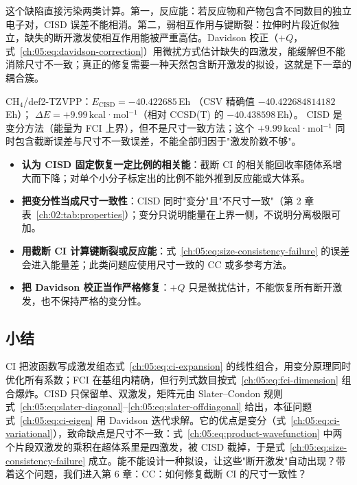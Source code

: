 这个缺陷直接污染两类计算。第一，反应能：若反应物和产物包含不同数目的独立电子对，CISD 误差不能相消。第二，弱相互作用与键断裂：拉伸时片段近似独立，缺失的断开激发使相互作用能被严重高估。Davidson 校正（$+Q$，式~\eqref{ch:05:eq:davidson-correction}）用微扰方式估计缺失的四激发，能缓解但不能消除尺寸不一致；真正的修复需要一种天然包含断开激发的拟设，这就是下一章的耦合簇。

\begin{ch4box}
CH$_4$/def2-TZVPP：$E_{\mathrm{CISD}} = -40.422685$\,Eh
（CSV 精确值 $-40.422684814182$\,Eh）；
$\Delta E = +9.99$\,kcal·mol$^{-1}$（相对 CCSD(T) 的 $-40.438598$\,Eh）。
CISD 是变分方法（能量为 FCI 上界），但不是尺寸一致方法；这个 $+9.99$\,kcal·mol$^{-1}$ 同时包含截断误差与尺寸不一致误差，不能全部归因于"激发阶数不够"。
\end{ch4box}

\begin{pitfall}
\begin{itemize}
  \item \textbf{认为 CISD 固定恢复一定比例的相关能}：截断 CI 的相关能回收率随体系增大而下降；对单个小分子标定出的比例不能外推到反应能或大体系。
  \item \textbf{把变分性当成尺寸一致性}：CISD 同时"变分"且"不尺寸一致"（第 2 章表~\ref{ch:02:tab:properties}）；变分只说明能量在上界一侧，不说明分离极限可加。
  \item \textbf{用截断 CI 计算键断裂或反应能}：式~\eqref{ch:05:eq:size-consistency-failure} 的误差会进入能量差；此类问题应使用尺寸一致的 CC 或多参考方法。
  \item \textbf{把 Davidson 校正当作严格修复}：$+Q$ 只是微扰估计，不能恢复所有断开激发，也不保持严格的变分性。
\end{itemize}
\end{pitfall}

\subsection*{小结}
CI 把波函数写成激发组态式~\eqref{ch:05:eq:ci-expansion} 的线性组合，用变分原理同时优化所有系数；FCI 在基组内精确，但行列式数目按式~\eqref{ch:05:eq:fci-dimension} 组合爆炸。CISD 只保留单、双激发，矩阵元由 Slater--Condon 规则式~\eqref{ch:05:eq:slater-diagonal}--\eqref{ch:05:eq:slater-offdiagonal} 给出，本征问题式~\eqref{ch:05:eq:ci-eigen} 用 Davidson 迭代求解。它的优点是变分（式~\eqref{ch:05:eq:ci-variational}），致命缺点是尺寸不一致：式~\eqref{ch:05:eq:product-wavefunction} 中两个片段双激发的乘积在超体系里是四激发，被 CISD 截掉，于是式~\eqref{ch:05:eq:size-consistency-failure} 成立。能不能设计一种拟设，让这些"断开激发"自动出现？带着这个问题，我们进入第 6 章：CC：如何修复截断 CI 的尺寸一致性？
